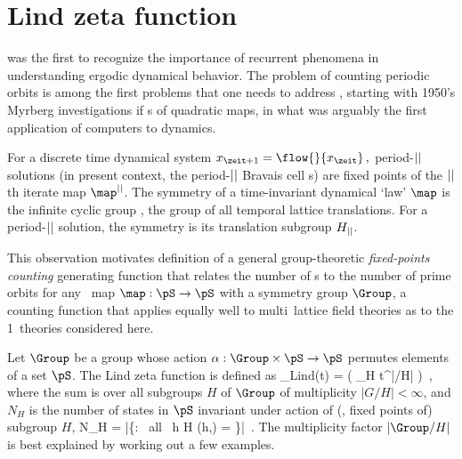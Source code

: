 

\section{Lind zeta function}
\label{sect:LC21Lind1d}

\Poincare{} was the first to  recognize the importance of
recurrent phenomena in understanding ergodic dynamical behavior. The
problem of counting periodic orbits is among the first problems that one
needs to address%
, starting with 1950's
 {Myrberg}
investigations if {\po}s of quadratic maps, in what was arguably the
first application of computers to
dynamics.

For a discrete time dynamical system
\(
\ssp_{\zeit+1}=\flow{}{\ssp_{\zeit}}
\,,\)
period-${||}$ solutions (in present context, the period-${||}$ Bravais
cell {\lattstate}s) are fixed points of the ${||}$th iterate map
$\map^\cl{}$.
The symmetry of a time-invariant dynamical `law' $\map$ is
the {infinite cyclic group} \Cn{\infty},
the group of all temporal lattice translations. For a period-${||}$
solution, the symmetry is its translation subgroup $H_{{||}}$.

This observation motivates definition of a general group-theoretic
\emph{fixed-points counting} generating  function that relates the number
of {\lattstate}s to the number of prime orbits for any \statesp\ map
\(
\map : \pS \to \pS
\)
with a symmetry group $\Group$, a counting function that applies equally
well to multi\dmn\ lattice field theories as to the 1\dmn\
theories considered here.

Let $\Group$ be a group whose action
$\alpha: \Group \times \pS \to \pS$
permutes elements of a set $\pS$.
The Lind zeta function is defined as
\beq
\zeta_{Lind}(t) =
\exp \left( \sum_{H} \;
            t^{|\Group/H|}
      \right)
\,,
where the sum is over all subgroups $H$ of $\Group$
of multiplicity $|G/H| < \infty$, and $N_{H}$ is the number of states
in $\pS$ invariant under action of (\ie, fixed points of) subgroup $H$,
\beq
N_{H} =
   |\{\Xx \in \pS : \mbox{ all } h \in H \quad \alpha(h,\Xx) = \Xx\}|
\,.
The multiplicity factor $|\Group/{H}|$ is best explained by working out a
few examples.

